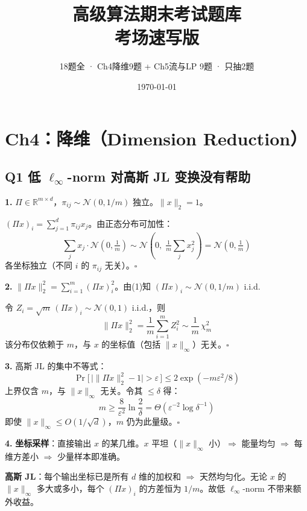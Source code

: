\documentclass[11pt,a4paper]{ctexart}
\newcommand{\R}{\mathbb{R}}
\newcommand{\calN}{\mathcal{N}}
\begin{document}
\title{\textbf{高级算法期末考试题库 \\ 考场速写版}}
\author{18题全 · Ch4降维9题 + Ch5流与LP 9题 · 只抽2题}
\date{\today}
\maketitle
\thispagestyle{fancy}

\setcounter{page}{1}

\section*{Ch4：降维（Dimension Reduction）}

\subsection*{Q1 \quad 低 $\ell_\infty$-norm 对高斯 JL 变换没有帮助}

\textbf{1.} $\Pi \in \R^{m\times d}$，$\pi_{ij} \sim \calN(0, 1/m)$ 独立。$\|x\|_2 = 1$。

$(\Pi x)_i = \sum_{j=1}^d \pi_{ij} x_j$。由正态分布可加性：
\[
\sum_j x_j \cdot \calN(0, \tfrac{1}{m}) \sim \calN\!\left(0,\; \tfrac{1}{m}\sum_j x_j^2\right) = \calN(0, \tfrac{1}{m})
\]
各坐标独立（不同 $i$ 的 $\pi_{ij}$ 无关）。\hfill $\square$

\textbf{2.} $\|\Pi x\|_2^2 = \sum_{i=1}^m (\Pi x)_i^2$。由(1)知 $(\Pi x)_i \sim \calN(0, 1/m)$ i.i.d.

令 $Z_i = \sqrt{m}\,(\Pi x)_i \sim \calN(0,1)$ i.i.d.，则
\[
\|\Pi x\|_2^2 = \frac{1}{m}\sum_{i=1}^m Z_i^2 \sim \frac{1}{m}\,\chi^2_m
\]
该分布仅依赖于 $m$，与 $x$ 的坐标值（包括 $\|x\|_\infty$）无关。\hfill $\square$

\textbf{3.} 高斯 JL 的集中不等式：
\[
\Pr\!\big[\,\big|\|\Pi x\|_2^2 - 1\big| > \varepsilon\,\big] \leq 2\exp(-m\varepsilon^2/8)
\]
上界仅含 $m$，与 $\|x\|_\infty$ 无关。令其 $\leq \delta$ 得：
\[
m \geq \frac{8}{\varepsilon^2}\ln\frac{2}{\delta} = \Theta(\varepsilon^{-2}\log\delta^{-1})
\]
即使 $\|x\|_\infty \leq O(1/\sqrt{d})$，$m$ 仍为此量级。\hfill $\square$

\textbf{4.} \textbf{坐标采样}：直接输出 $x$ 的某几维。$x$ 平坦（$\|x\|_\infty$ 小）$\Rightarrow$ 能量均匀 $\Rightarrow$ 每维方差小 $\Rightarrow$ 少量样本即准确。

\textbf{高斯 JL}：每个输出坐标已是所有 $d$ 维的加权和 $\Rightarrow$ 天然均匀化。无论 $x$ 的 $\|x\|_\infty$ 多大或多小，每个 $(\Pi x)_i$ 的方差恒为 $1/m$。故低 $\ell_\infty$-norm 不带来额外收益。
\end{document}
